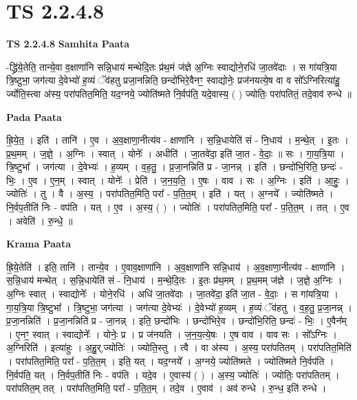 \documentclass[17pt]{extarticle}
\begin{document}
\section{ TS 2.2.4.8 }

\textbf{TS 2.2.4.8 } \newline
\textbf{Samhita Paata} \newline

-द्ध्रि॑ये॒तेति॒ तान्ये॒वा व॒क्षाणा॑नि सन्नि॒धाय॑ मन्थेदि॒तः प्र॑थ॒मं ज॑ज्ञे अ॒ग्निः स्वाद्योने॒रधि॑ जा॒तवे॑दाः । स गा॑यत्रि॒या त्रि॒ष्टुभा॒ जग॑त्या दे॒वेभ्यो॑ ह॒व्यं ॅव॑हतु प्रजा॒नन्निति॒ छन्दो॑भिरे॒वैनꣳ॒॒ स्वाद्योनेः॒ प्रज॑नयत्ये॒ष वा व सो᳚ऽग्निरित्या॑हु॒ र्ज्योति॒स्त्वा अ॑स्य॒ परा॑पतित॒मिति॒ यद॒ग्नये॒ ज्योति॑ष्मते नि॒र्वप॑ति॒ यदे॒वास्य॒ ( ) ज्योतिः॒ परा॑पतितं॒ तदे॒वाव॑ रुन्धे ॥ \newline

\textbf{Pada Paata} \newline

ह्रि॒ये॒त॒ । इति॑ । तानि॑ । ए॒व । अ॒व॒क्षाणा॒नीत्य॑व - क्षाणा॑नि । स॒न्नि॒धायेति॑ सं - नि॒धाय॑ । म॒न्थे॒त् । इ॒तः । प्र॒थ॒मम् । ज॒ज्ञे॒ । अ॒ग्निः । स्वात् । योनेः᳚ । अधीति॑ । जा॒तवे॑दा॒ इति॑ जा॒त - वे॒दाः॒ ॥ सः । गा॒य॒त्रि॒या । त्रि॒ष्टुभा᳚ । जग॑त्या । दे॒वेभ्यः॑ । ह॒व्यम् । व॒ह॒तु॒ । प्र॒जा॒नन्निति॑ प्र - जा॒नन्न् । इति॑ । छन्दो॑भि॒रिति॒ छन्दः॑ - भिः॒ । ए॒व । ए॒न॒म् । स्वात् । योनेः᳚ । प्रेति॑ । ज॒न॒य॒ति॒ । ए॒षः । वाव । सः । अ॒ग्निः । इति॑ । आ॒हुः॒ । ज्योतिः॑ । तु । वै । अ॒स्य॒ । परा॑पतित॒मिति॒ परा᳚ - प॒ति॒त॒म् । इति॑ । यत् । अ॒ग्नये᳚ । ज्योति॑ष्मते । नि॒र्वप॒तीति॑ निः - वप॑ति । यत् । ए॒व । अ॒स्य॒ ( ) । ज्योतिः॑ । परा॑पतित॒मिति॒ परा᳚ - प॒ति॒त॒म् । तत् । ए॒व । अवेति॑ । रु॒न्धे॒ ॥  \newline


\textbf{Krama Paata} \newline

ह्रि॒ये॒तेति॑ । इति॒ तानि॑ । तान्ये॒व । ए॒वाव॒क्षाणा॑नि । अ॒व॒क्षाणा॑नि सन्नि॒धाय॑ । अ॒व॒क्षाणा॒नीत्य॑व - क्षाणा॑नि । स॒न्नि॒धाय॑ मन्थेत् । स॒न्नि॒धायेति॑ सं - नि॒धाय॑ । म॒न्थे॒दि॒तः । इ॒तः प्र॑थ॒मम् । प्र॒थ॒मम् ज॑ज्ञे । ज॒ज्ञे॒ अ॒ग्निः । अ॒ग्निः स्वात् । स्वाद्योनेः᳚ । योने॒रधि॑ । अधि॑ जा॒तवे॑दाः । जा॒तवे॑दा॒ इति॑ जा॒त - वे॒दाः॒ । स गा॑यत्रि॒या । गा॒य॒त्रि॒या त्रि॒ष्टुभा᳚ । त्रि॒ष्टुभा॒ जग॑त्या । जग॑त्या दे॒वेभ्यः॑ । दे॒वेभ्यो॑ ह॒व्यम् । ह॒व्यं ॅव॑हतु । व॒ह॒तु॒ प्र॒जा॒नन्न् । प्र॒जा॒नन्निति॑ । प्र॒जा॒नन्निति॑ प्र - जा॒नन्न् । इति॒ छन्दो॑भिः । छन्दो॑भिरे॒व । छन्दो॑भि॒रिति॒ छन्दः॑ - भिः॒ । ए॒वैन᳚म् । ए॒नꣳ॒॒ स्वात् । स्वाद्योनेः᳚ । योनेः॒ प्र । प्र ज॑नयति । ज॒न॒य॒त्ये॒षः । ए॒ष वाव । वाव सः । सो᳚ऽग्निः । अ॒ग्निरिति॑ । इत्या॑हुः । अ॒हु॒र्,ज्योतिः॑ । ज्योति॒स्तु । त्वै । वा अ॑स्य । अ॒स्य॒ परा॑पतितम् । परा॑पतित॒मिति॑ । परा॑पतित॒मिति॒ परा᳚ - प॒ति॒त॒म् । इति॒ यत् । यद॒ग्नये᳚ । अ॒ग्नये॒ ज्योति॑ष्मते । ज्योति॑ष्मते नि॒र्वप॑ति । नि॒र्वप॑ति॒ यत् । नि॒र्वप॒तीति॑ निः - वप॑ति । यदे॒व । ए॒वास्य॑ ( ) । अ॒स्य॒ ज्योतिः॑ । ज्योतिः॒ परा॑पतितम् । परा॑पतित॒म् तत् । परा॑पतित॒मिति॒ परा᳚ - प॒ति॒त॒म् । तदे॒व । ए॒वाव॑ । अव॑ रुन्धे । रु॒न्ध॒ इति॑ रुन्धे । \newline
\end{document}

